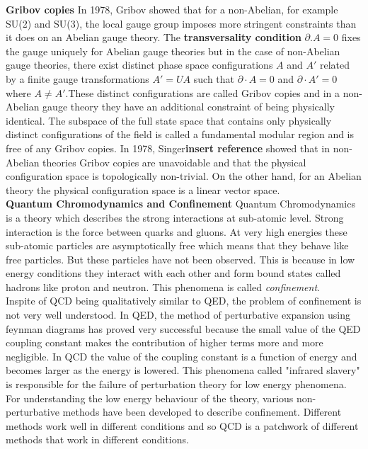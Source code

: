 \begin{description}
\textbf{Gribov copies}
In 1978, Gribov showed that for a non-Abelian, for example SU(2) and SU(3), the local gauge group imposes more stringent constraints than it does on an Abelian gauge theory. The \textbf{transversality condition} $ \partial.A=0$ fixes the gauge uniquely for Abelian gauge theories but in the case of non-Abelian gauge theories, there exist distinct phase space configurations $A$ and $A'$ related by a finite gauge transformations $A' = U A$ such that $\partial\cdot A=0$ and $\partial\cdot A'=0$ where $A \neq A'$.These distinct configurations are called Gribov copies and in a non-Abelian gauge theory they have an additional constraint of being physically identical. The subspace of the full state space that contains only physically distinct configurations of the field is called a fundamental modular region and is free of any Gribov copies. In 1978, Singer\textbf{insert reference} showed that in non-Abelian theories Gribov copies are unavoidable and that the physical configuration space is topologically non-trivial. On the other hand, for an Abelian theory the physical configuration space is a linear vector space.
\\
\textbf{Quantum Chromodynamics and Confinement}
Quantum Chromodynamics is a theory which describes the strong interactions at sub-atomic level. Strong interaction is the force between quarks and gluons. At very high energies these sub-atomic particles are asymptotically free which means that they behave like free particles. But these particles have not been observed. This is because in low energy conditions they interact with each other and form bound states called hadrons like proton and neutron. This phenomena is called \emph{confinement}.\\
Inspite of QCD being qualitatively similar to QED, the problem of confinement is not very well understood. In QED, the method of perturbative expansion using feynman diagrams has proved very successful because the small value of the QED coupling constant makes the contribution of higher terms more and more negligible. In QCD the value of the coupling constant is a function of energy and becomes larger as the energy is lowered. This phenomena called "infrared slavery" is responsible for the failure of perturbation theory for low energy phenomena. For understanding the low energy behaviour of the theory, various non-perturbative methods have been developed to describe confinement. Different methods work well in different conditions and so QCD is a patchwork of different methods that work in different conditions.  

\end{description}
